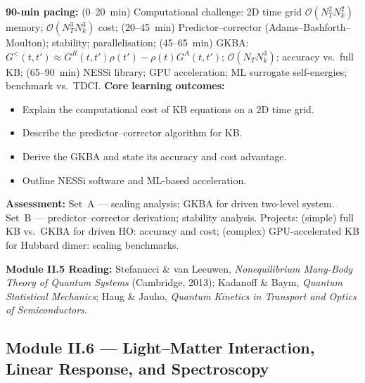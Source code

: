 \documentclass[11pt,a4paper]{article}
\begin{document}
\medskip

\begin{tcolorbox}[modulebox, title={Module~II.5 --- Lecture L12: Numerical Methods for NEGF}]
\textbf{90-min pacing:} (0--20~min) Computational challenge: 2D time grid $\mathcal{O}(N_T^2N_k^2)$ memory; $\mathcal{O}(N_T^3N_k^3)$ cost; (20--45~min) Predictor--corrector (Adams--Bashforth--Moulton); stability; parallelisation; (45--65~min) GKBA: $G^<(t,t')\approx G^R(t,t')\rho(t')-\rho(t)G^A(t,t')$; $\mathcal{O}(N_TN_k^3)$; accuracy vs.\ full KB; (65--90~min) NESSi library; GPU acceleration; ML surrogate self-energies; benchmark vs.\ TDCI.
\medskip\textbf{Core learning outcomes:}
\begin{itemize}[leftmargin=1.4em,topsep=2pt,itemsep=1pt]
  \item Explain the computational cost of KB equations on a 2D time grid.
  \item Describe the predictor--corrector algorithm for KB.
  \item Derive the GKBA and state its accuracy and cost advantage.
  \item Outline NESSi software and ML-based acceleration.
\end{itemize}
\medskip\textbf{Assessment:}
Set~A --- scaling analysis; GKBA for driven two-level system.
Set~B --- predictor--corrector derivation; stability analysis.
Projects: (simple) full KB vs.\ GKBA for driven HO: accuracy and cost; (complex) GPU-accelerated KB for Hubbard dimer: scaling benchmarks.
\end{tcolorbox}

\begin{tcolorbox}[highlightbox]
\textbf{Module II.5 Reading:} Stefanucci \& van Leeuwen, \textit{Nonequilibrium Many-Body Theory of Quantum Systems} (Cambridge, 2013); Kadanoff \& Baym, \textit{Quantum Statistical Mechanics}; Haug \& Jauho, \textit{Quantum Kinetics in Transport and Optics of Semiconductors}.
\end{tcolorbox}

\subsection{Module II.6 --- Light--Matter Interaction, Linear Response, and Spectroscopy}
\label{sec:mod-II6}
\end{document}
